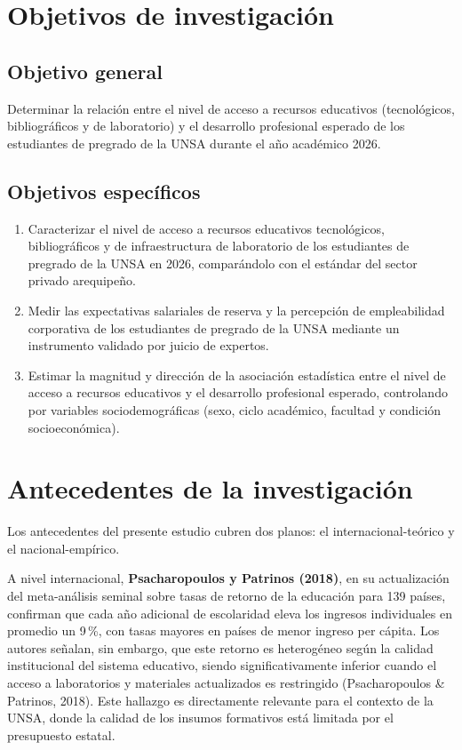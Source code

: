 \documentclass[11pt, a4paper]{article}
\begin{document}
\section{Objetivos de investigación}

\subsection{Objetivo general}

Determinar la relación entre el nivel de acceso a recursos educativos (tecnológicos, bibliográficos y de laboratorio) y el desarrollo profesional esperado de los estudiantes de pregrado de la UNSA durante el año académico 2026.

\subsection{Objetivos específicos}

\begin{enumerate}
    \item Caracterizar el nivel de acceso a recursos educativos tecnológicos, bibliográficos y de infraestructura de laboratorio de los estudiantes de pregrado de la UNSA en 2026, comparándolo con el estándar del sector privado arequipeño.
    \item Medir las expectativas salariales de reserva y la percepción de empleabilidad corporativa de los estudiantes de pregrado de la UNSA mediante un instrumento validado por juicio de expertos.
    \item Estimar la magnitud y dirección de la asociación estadística entre el nivel de acceso a recursos educativos y el desarrollo profesional esperado, controlando por variables sociodemográficas (sexo, ciclo académico, facultad y condición socioeconómica).
\end{enumerate}

\section{Antecedentes de la investigación}

Los antecedentes del presente estudio cubren dos planos: el internacional-teórico y el nacional-empírico.

A nivel internacional, \textbf{Psacharopoulos y Patrinos (2018)}, en su actualización del meta-análisis seminal sobre tasas de retorno de la educación para 139 países, confirman que cada año adicional de escolaridad eleva los ingresos individuales en promedio un 9\,\%, con tasas mayores en países de menor ingreso per cápita. Los autores señalan, sin embargo, que este retorno es heterogéneo según la calidad institucional del sistema educativo, siendo significativamente inferior cuando el acceso a laboratorios y materiales actualizados es restringido (Psacharopoulos \& Patrinos, 2018). Este hallazgo es directamente relevante para el contexto de la UNSA, donde la calidad de los insumos formativos está limitada por el presupuesto estatal.
\end{document}

